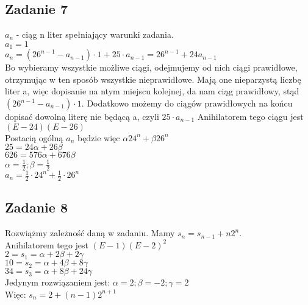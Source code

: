 \documentclass[a4paper]{article}
\begin{document}
\subsection*{Zadanie 7}
$a_n$ - ciąg n liter spełniający warunki zadania.\\
$a_1 = 1$\\
$a_n = (26^{n-1} - a_{n-1})\cdot 1 + 25\cdot a_{n-1} = 26^{n-1} + 24a_{n-1}$\\
Bo wybieramy wszystkie możliwe ciągi, odejmujemy od nich ciągi prawidłowe, otrzymując w ten sposób wszystkie nieprawidłowe. Mają one nieparzystą liczbę liter a, więc dopisanie na ntym miejscu kolejnej, da nam ciąg prawidłowy, stąd $(26^{n-1} - a_{n-1})\cdot 1$. Dodatkowo możemy do ciągów prawidłowych na końcu dopisać dowolną literę nie będącą a, czyli $25 \cdot a_{n-1}$
Anihilatorem tego ciągu jest $(E-24)(E-26)$\\
Postacią ogólną $a_n$ będzie więc $\alpha 24^n + \beta 26^n$\\
$ 25 = 24 \alpha + 26 \beta$\\
$626 = 576 \alpha + 676 \beta$\\
$\alpha = \frac{1}{2}; \beta = \frac{1}{2}$\\
$a_n = \frac{1}{2}\cdot 24^n + \frac{1}{2}\cdot 26^n$

\subsection*{Zadanie 8}
Rozwiążmy zależność daną w zadaniu. Mamy $s_n=s_{n-1}+n2^n$.\\
Anihilatorem tego jest $(E-1)(E-2)^2$\\
$2 = s_1 = \alpha + 2\beta + 2\gamma $\\
$10 = s_2 = \alpha + 4\beta + 8\gamma $\\
$34 = s_3 = \alpha + 8\beta + 24\gamma$\\
Jedynym rozwiązaniem jest: $ \alpha = 2; \beta = -2; \gamma = 2$\\
Więc: $ s_n = 2 + (n-1)2^{n+1}$
\end{document}
